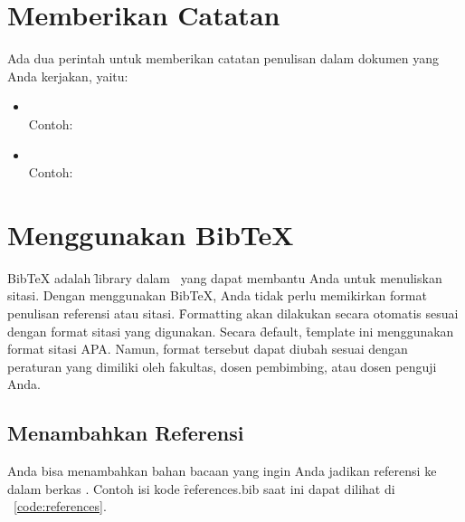 \section{Memberikan Catatan}
\label{sec:note}
Ada dua perintah untuk memberikan catatan penulisan dalam dokumen yang Anda kerjakan, yaitu: 
\begin{itemize}
	\item {} \\
	Contoh: \\ 
	\item {} \\ 
	Contoh: \todoCite
\end{itemize}


\section{Menggunakan BibTeX}
\label{sec:bibtex}
BibTeX adalah \f{library} dalam \latex~yang dapat membantu Anda untuk menuliskan sitasi. Dengan menggunakan BibTeX, Anda tidak perlu memikirkan format penulisan referensi atau sitasi. \f{Formatting} akan dilakukan secara otomatis sesuai dengan format sitasi yang digunakan. Secara \f{default}, \f{template} ini menggunakan format sitasi APA. Namun, format tersebut dapat diubah sesuai dengan peraturan yang dimiliki oleh fakultas, dosen pembimbing, atau dosen penguji Anda.


\subsection{Menambahkan Referensi}
\label{sec:bibtexAddRef}
Anda bisa menambahkan bahan bacaan yang ingin Anda jadikan referensi ke dalam berkas . Contoh isi kode \f{references.bib} saat ini dapat dilihat di \lst~\ref{code:references}.


